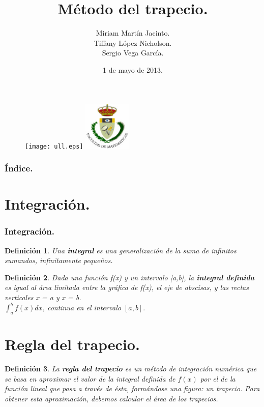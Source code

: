 \documentclass{beamer}
\title[Integración]{Método del trapecio.}
\author[Grupo-2D]{Miriam Martín Jacinto.\\Tiffany López Nicholson.\\Sergio Vega García.}
\date[01/05/2013]{1 de mayo de 2013.}
\newtheorem{definicion}{Definición}
\begin{document}
  \begin{frame}
    \begin{figure}[lt]
      \texttt{[image: ull.eps]}
      \hspace{5.5cm}
      \includegraphics[width=0.2\textwidth]{fmatesc.eps}
    \end{figure}
    \titlepage
  \end{frame}
  \begin{frame}
    \frametitle{Índice.}
    \tableofcontents[pausesections]
  \end{frame}
  \section{Integración.}
  \begin{frame}
    \frametitle{Integración.}
      \begin{definicion}
	Una \textbf{integral} es una generalización de la suma de infinitos sumandos, infinitamente pequeños.
      \end{definicion}
	
      \begin{definicion}
	Dada una función f(x) y un intervalo [a,b], la \textbf{integral definida} es igual al área limitada entre la gráfica de f(x), el eje de abscisas, y las rectas verticales x = a y x = b.\\
	$\int_{a}^{b} f(x) dx$, continua en el intervalo $[a, b].$
      \end{definicion}
  \end{frame}
  \section{Regla del trapecio.}
  \begin{frame}
    \begin{definicion}
      La \textbf{regla del trapecio} es un método de integración numérica que se basa en aproximar el valor de la integral definida de $f(x)$ por el de la función lineal que pasa a través de ésta, formándose una figura: un trapecio. Para obtener esta aproximación, debemos calcular el área de los trapecios.
    \end{definicion}
  \end{frame}
\end{document}
